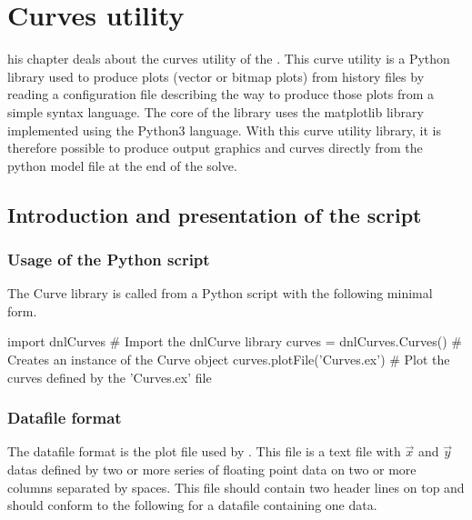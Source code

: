 %
%
%
\chapter{Curves utility}\label{chap:CU!CU}

\startcontents[chapters]
\printmyminitoc[1]

his chapter deals about the curves utility of the \DynELA. This curve utility is a Python library used to produce plots (vector or bitmap plots) from \DynELA history files by reading a configuration file describing the way to produce those plots from a simple syntax language. The core of the library uses the matplotlib library implemented using the Python3 language. With this curve utility library, it is therefore possible to produce output graphics and curves directly from the python model file at the end of the solve.

\section{Introduction and presentation of the script}

\subsection{Usage of the Python script}

The Curve library is called from a Python script with the following minimal form.

\begin{PythonListing}
import dnlCurves              # Import the dnlCurve library
curves = dnlCurves.Curves()   # Creates an instance of the Curve object
curves.plotFile('Curves.ex')  # Plot the curves defined by the 'Curves.ex' file
\end{PythonListing}

\subsection{Datafile format}

The datafile format is the plot file used by \DynELA. This file is a text file with $\overrightarrow{x}$ and $\overrightarrow{y}$ datas defined by two or more series of floating point data on two or more columns separated by spaces. This file should contain two header lines on top and should conform to the following for a datafile containing one data.

